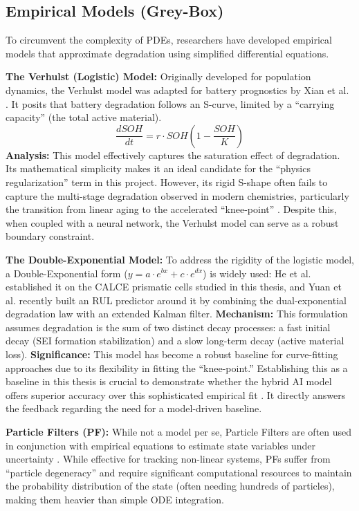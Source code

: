 \subsection{Empirical Models (Grey-Box)}

To circumvent the complexity of PDEs, researchers have developed empirical models that approximate degradation using simplified differential equations.

\textbf{The Verhulst (Logistic) Model:} Originally developed for population dynamics, the Verhulst model was adapted for battery prognostics by Xian et al. \cite{verhulst_pso}. It posits that battery degradation follows an S-curve, limited by a ``carrying capacity'' (the total active material).
\begin{equation}
    \frac{dSOH}{dt} = r \cdot SOH \left(1 - \frac{SOH}{K}\right)
\end{equation}
\textbf{Analysis:} This model effectively captures the saturation effect of degradation. Its mathematical simplicity makes it an ideal candidate for the ``physics regularization'' term in this project. However, its rigid S-shape often fails to capture the multi-stage degradation observed in modern chemistries, particularly the transition from linear aging to the accelerated ``knee-point'' \cite{ref1_general}. Despite this, when coupled with a neural network, the Verhulst model can serve as a robust boundary constraint.

\textbf{The Double-Exponential Model:} To address the rigidity of the logistic model, a Double-Exponential form ($y = a \cdot e^{bx} + c \cdot e^{dx}$) is widely used: He et al. \cite{he_calce} established it on the CALCE prismatic cells studied in this thesis, and Yuan et al. \cite{ma_dual_exp} recently built an RUL predictor around it by combining the dual-exponential degradation law with an extended Kalman filter.
\textbf{Mechanism:} This formulation assumes degradation is the sum of two distinct decay processes: a fast initial decay (SEI formation stabilization) and a slow long-term decay (active material loss).
\textbf{Significance:} This model has become a robust baseline for curve-fitting approaches due to its flexibility in fitting the ``knee-point.'' Establishing this as a baseline in this thesis is crucial to demonstrate whether the hybrid AI model offers superior accuracy over this sophisticated empirical fit \cite{wang_pinn}. It directly answers the feedback regarding the need for a model-driven baseline.

\textbf{Particle Filters (PF):} While not a model per se, Particle Filters are often used in conjunction with empirical equations to estimate state variables under uncertainty \cite{particle_filter_ai}. While effective for tracking non-linear systems, PFs suffer from ``particle degeneracy'' and require significant computational resources to maintain the probability distribution of the state (often needing hundreds of particles), making them heavier than simple ODE integration.

